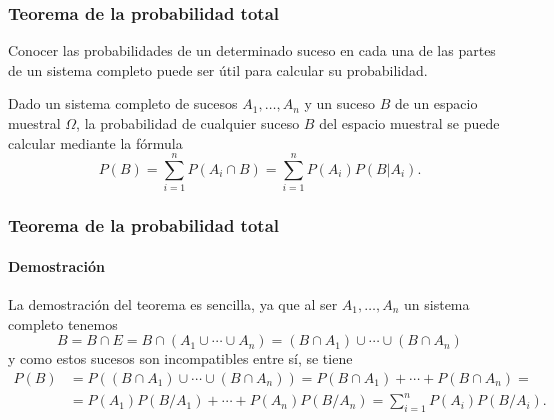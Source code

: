\begin{frame}
\frametitle{Teorema de la probabilidad total}
Conocer las probabilidades de un determinado suceso en cada una de las partes de un sistema completo puede ser útil para calcular su probabilidad.
\begin{teorema}
Dado un sistema completo de sucesos $A_1,\ldots,A_n$ y un suceso $B$ de un espacio muestral $\Omega$, la probabilidad de cualquier suceso $B$ del espacio muestral se puede calcular mediante la fórmula
\[
	P(B) = \sum_{i=1}^n P(A_i\cap B) = \sum_{i=1}^n P(A_i)P(B|A_i).
\]
\end{teorema}

\end{frame}


\begin{frame}
\frametitle{Teorema de la probabilidad total}
\framesubtitle{Demostración}
La demostración del teorema es sencilla, ya que al ser $A_1,\ldots,A_n$ un sistema completo tenemos
\[
B = B\cap E = B\cap (A_1\cup \cdots \cup A_n) = (B\cap A_1)\cup \cdots \cup (B\cap A_n)
\]
y como estos sucesos son incompatibles entre sí, se tiene
\begin{align*}
P(B) &= P((B\cap A_1)\cup \cdots \cup (B\cap A_n)) = P(B\cap A_1)+\cdots + P(B\cap A_n) =\\
&= P(A_1)P(B/A_1)+\cdots + P(A_n)P(B/A_n) = \sum_{i=1}^n P(A_i)P(B/A_i).
\end{align*}
	
\begin{center}
\end{center}

\end{frame}


